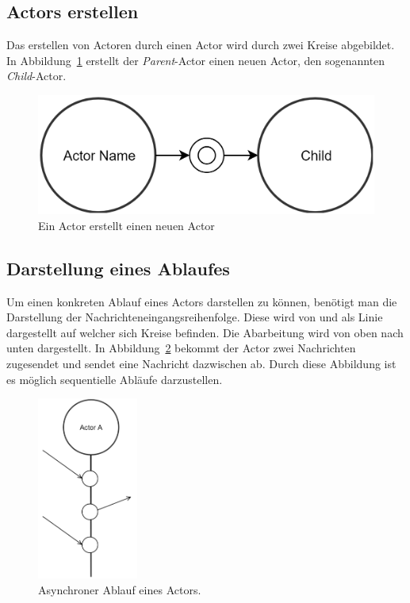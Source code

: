 \subsection{Actors erstellen}
Das erstellen von Actoren durch einen Actor wird durch zwei Kreise abgebildet. In Abbildung~\ref{fig:actor:diagram:childActorCreation} erstellt der \textit{Parent}-Actor einen neuen Actor, den sogenannten \textit{Child}-Actor.
\begin{figure}
    \centering
    \includegraphics[width=.7\linewidth]{gfx/actor/childActorCreation}
    \caption{Ein Actor erstellt einen neuen Actor}
    \label{fig:actor:diagram:childActorCreation}
\end{figure}

\subsection{Darstellung eines Ablaufes}
Um einen konkreten Ablauf eines Actors darstellen zu können, benötigt man die Darstellung der Nachrichteneingangsreihenfolge. Diese wird von \cite{kuhn2017reactive} und \cite{Vernon2015ReactiveAkka} als Linie dargestellt auf welcher sich Kreise befinden. Die Abarbeitung wird von oben nach unten dargestellt. In Abbildung~\ref{fig:actor:diagram:asynchronMessageReceivment} bekommt der Actor zwei Nachrichten zugesendet und sendet eine Nachricht dazwischen ab. Durch diese Abbildung ist es möglich sequentielle Abläufe darzustellen.
\begin{figure}
    \centering
    \includegraphics[height=6cm]{gfx/actor/actorAsynchMessgeFlow}
    \caption{Asynchroner Ablauf eines Actors.}
    \label{fig:actor:diagram:asynchronMessageReceivment}
\end{figure}